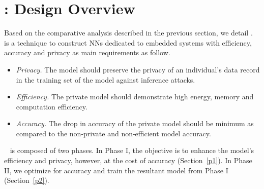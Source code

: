 \section{\method: Design Overview}\label{design}

Based on the comparative analysis described in the previous section, we detail \method\hspace{0.02in}.
\method~ is a technique to construct NNs dedicated to embedded systems with efficiency, accuracy and privacy as main requirements as follow.

\begin{itemize}[leftmargin=*]

\item {\em Privacy.}
The model should preserve the privacy of an individual's data record in the training set of the model against inference attacks.

\item {\em Efficiency.}
The private model should demonstrate high energy, memory and computation efficiency.

\item {\em Accuracy.}
The drop in accuracy of the private model should be minimum as compared to the non-private and non-efficient model accuracy.
\end{itemize}


\method~ is composed of two phases.
In Phase I, the objective is to enhance the model's efficiency and privacy, however, at the cost of accuracy (Section~\ref{p1}).
In Phase II, we optimize for accuracy and train the resultant model from Phase I (Section~\ref{p2}).









